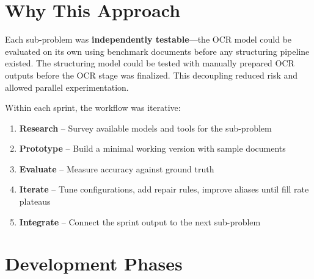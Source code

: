 \documentclass[12pt,a4paper]{report}
\begin{document}
\section{Why This Approach}

Each sub-problem was \textbf{independently testable}---the OCR model could be evaluated on its own using benchmark documents before any structuring pipeline existed. The structuring model could be tested with manually prepared OCR outputs before the OCR stage was finalized. This decoupling reduced risk and allowed parallel experimentation.

Within each sprint, the workflow was iterative:
\begin{enumerate}[nosep]
    \item \textbf{Research} -- Survey available models and tools for the sub-problem
    \item \textbf{Prototype} -- Build a minimal working version with sample documents
    \item \textbf{Evaluate} -- Measure accuracy against ground truth
    \item \textbf{Iterate} -- Tune configurations, add repair rules, improve aliases until fill rate plateaus
    \item \textbf{Integrate} -- Connect the sprint output to the next sub-problem
\end{enumerate}

\section{Development Phases}
\end{document}
